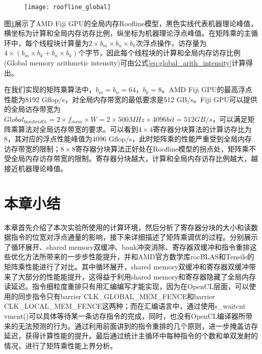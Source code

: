 \begin{figure}[htbp]
	\centering
	\texttt{[image: roofline\_global]}
	\label{fig:roofline_global}
\end{figure}

图\ref{fig:roofline_global}展示了AMD Fiji GPU的全局内存Roofline模型，黑色实线代表机器理论峰值，横坐标为计算和全局内存访存比例，纵坐标为机器理论浮点峰值。在矩阵乘的主循环中，每个线程块计算量为$2\times b_m \times b_n \times b_k$次浮点操作，访存量为$4\times (b_m \times b_k + b_n\times b_k)$个字节，因此每个线程块的计算和全局内存访存比例(Global memory arithmetic intensity)可由公式\ref{eq:global_arith_intensity}计算得出。

在我们实现的矩阵乘算法中，$b_m = b_n = 64$，$b_k = 8$。AMD Fiji GPU的最高浮点性能为8192 Gflop/s，对全局内存带宽的最低要求是512 GB/s。Fiji GPU可以提供的全局访存带宽为$Global_{bandwidth} = 2 \times f_{mem} \times W = 2 \times 500MHz \times 4096bit = 512GB/s$，可以满足矩阵乘算法对全局访存带宽的要求。可以看到$4\times 4$寄存器分块算法的计算访存比为8，其对应的浮点性能峰值为4096 Gflop/s，此时矩阵乘的性能严重受到全局内存访存带宽的限制；$8\times 8$寄存器分块算法正好处在Roofline模型的拐点处，矩阵乘不受全局内存访存带宽的限制。寄存器分块越大，计算和全局内存访存比例越大，越接近机器理论峰值。


\section{本章小结}
本章首先介绍了本次实验所使用的计算环境，然后分析了寄存器分块的大小和读数据指令的位宽对浮点通量的影响，接下来详细描述了矩阵乘调优的过程。分别展示了循环展开、shared memory双缓冲、bank冲突消除、寄存器双缓冲和指令重排这些优化方法所带来的一步步性能提升，并和AMD官方数学库rocBLAS和Tensile的矩阵乘性能进行了对比。其中循环展开，shared memory双缓冲和寄存器双缓冲带来了大部分的性能能提升，这得益于利用shared memory和寄存器隐藏了全局内存读延迟。指令细粒度重排只有用汇编编写才能实现，因为在OpenCL层面，可以使用的同步指令只有barrier CLK\_GLOBAL\_MEM\_FENCE和barrier CLK\_LOCAL\_MEM\_FENCE这两种；而在汇编语言中，通过使用s\_waitcnt vmcnt()可以具体等待某一条访存指令的完成，同时，也没有OpenCL编译器所带来的无法预测的行为。通过利用前面讲到的指令重排的几个原则，进一步掩盖访存延迟，获得计算性能的提升。最后通过统计主循环中每种指令的个数和单双发射的情况，进行了矩阵乘性能上界分析。

